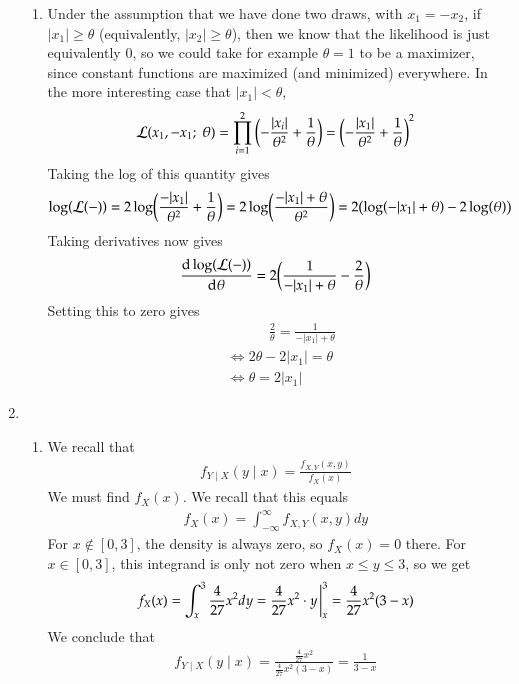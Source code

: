 \documentclass[12pt]{article}
\theoremstyle{definitionstyle}
\renewcommand{\L}{\mathcal{L}}
\newcommand{\semi}{; \;}
\begin{document}
\begin{enumerate}[leftmargin=\labelsep]
\begin{enumerate}
			\item Under the assumption that we have done two draws, with $x_1 = -x_2$, if $|x_1| \geq \theta$ (equivalently, $|x_2| \geq \theta$), then we know that the likelihood is just equivalently 0, so we could take for example $\theta = 1$ to be a maximizer, since constant functions are maximized (and minimized) everywhere. In the more interesting case that $|x_1| < \theta$,
			\begin{align*}
				\L(x_1, -x_1 \semi \theta) = \prod_{i=1}^2 \qty(-\frac{|x_i|}{\theta^2} + \frac1\theta) = \qty(-\frac{|x_1|}{\theta^2} + \frac1\theta)^2
			\end{align*}
			Taking the log of this quantity gives
			\begin{align*}
				\log(\L(-)) = 2\log(\frac{-|x_1|}{\theta^2} + \frac1\theta) = 2\log(\frac{-|x_1|+\theta}{\theta^2}) = 2\qty(\log(-|x_1|+\theta)-2\log(\theta))
			\end{align*}
			Taking derivatives now gives
			\begin{align*}
				\dv{\log(\L(-))}{\theta} = 2\qty(\frac{1}{-|x_1|+\theta} - \frac{2}{\theta})
			\end{align*}
			Setting this to zero gives
			\begin{align*}
				&\quad \quad \quad \frac{2}{\theta} = \frac{1}{-|x_1| + \theta} \\
				&\iff 2\theta - 2|x_1| = \theta \\
				&\iff \theta = 2|x_1|
			\end{align*}
			
		\end{enumerate}
		
		\newpage
		\item \begin{enumerate}
			\item We recall that
			\begin{align*}
				f_{Y \mid X}(y \mid x) = \frac{f_{X,Y}(x, y)}{f_X(x)}
			\end{align*}
			We must find $f_X(x)$. We recall that this equals
			\begin{align*}
				f_X(x) = \int_{-\infty}^\infty f_{X,Y}(x, y)dy
			\end{align*}
			For $x \not \in [0, 3]$, the density is always zero, so $f_X(x) = 0$ there. For $x \in [0, 3]$, this integrand is only not zero when $x \leq y \leq 3$, so we get
			\begin{align*}
				f_X(x) = \int_x^3 \frac{4}{27}x^2dy = \frac{4}{27} x^2 \cdot y\eval_x^3 = \frac{4}{27} x^2 (3-x)
			\end{align*}
			We conclude that
			\begin{align*}
				f_{Y \mid X}(y \mid x) = \frac{\frac{4}{27}x^2}{\frac{4}{27} x^2 (3-x)} = \frac{1}{3-x}
			\end{align*}
		

\end{enumerate}
\end{enumerate}
\end{document}
